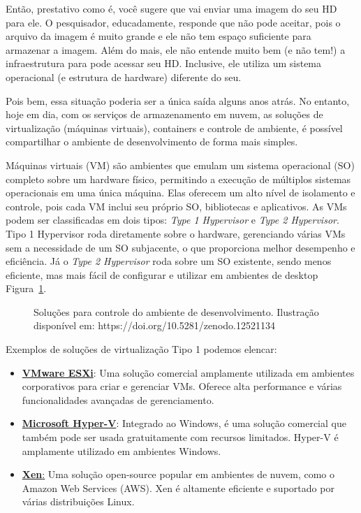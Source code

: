 \documentclass[
  a4paper,
]{article}
\begin{document}
Então, prestativo como é, você sugere que vai enviar uma imagem do seu
HD para ele. O pesquisador, educadamente, responde que não pode aceitar,
pois o arquivo da imagem é muito grande e ele não tem espaço suficiente
para armazenar a imagem. Além do mais, ele não entende muito bem (e não
tem!) a infraestrutura para pode acessar seu HD. Inclusive, ele utiliza
um sistema operacional (e estrutura de hardware) diferente do seu.

Pois bem, essa situação poderia ser a única saída alguns anos atrás. No
entanto, hoje em dia, com os serviços de armazenamento em nuvem, as
soluções de virtualização (máquinas virtuais), containers e controle de
ambiente, é possível compartilhar o ambiente de desenvolvimento de forma
mais simples.

Máquinas virtuais (VM) são ambientes que emulam um sistema operacional
(SO) completo sobre um hardware físico, permitindo a execução de
múltiplos sistemas operacionais em uma única máquina. Elas oferecem um
alto nível de isolamento e controle, pois cada VM inclui seu próprio SO,
bibliotecas e aplicativos. As VMs podem ser classificadas em dois tipos:
\emph{Type 1 Hypervisor} e \emph{Type 2 Hypervisor}. Tipo 1 Hypervisor
roda diretamente sobre o hardware, gerenciando várias VMs sem a
necessidade de um SO subjacente, o que proporciona melhor desempenho e
eficiência. Já o \emph{Type 2 Hypervisor} roda sobre um SO existente,
sendo menos eficiente, mas mais fácil de configurar e utilizar em
ambientes de desktop Figura~\ref{fig-vm-container}.

\begin{figure}


\caption{\label{fig-vm-container}Soluções para controle do ambiente de
desenvolvimento. Ilustração disponível em:
https://doi.org/10.5281/zenodo.12521134}

\end{figure}%

Exemplos de soluções de virtualização Tipo 1 podemos elencar:

\begin{itemize}
\item
  \href{https://www.vmware.com/products/esxi-and-esx.html.html}{\textbf{VMware
  ESXi}}: Uma solução comercial amplamente utilizada em ambientes
  corporativos para criar e gerenciar VMs. Oferece alta performance e
  várias funcionalidades avançadas de gerenciamento.
\item
  \href{https://learn.microsoft.com/pt-br/windows-server/virtualization/hyper-v/hyper-v-technology-overview}{\textbf{Microsoft
  Hyper-V}}: Integrado ao Windows, é uma solução comercial que também
  pode ser usada gratuitamente com recursos limitados. Hyper-V é
  amplamente utilizado em ambientes Windows.
\item
  \href{https://xenproject.org/}{\textbf{Xen}:} Uma solução open-source
  popular em ambientes de nuvem, como o Amazon Web Services (AWS). Xen é
  altamente eficiente e suportado por várias distribuições Linux.
\end{itemize}
\end{document}
